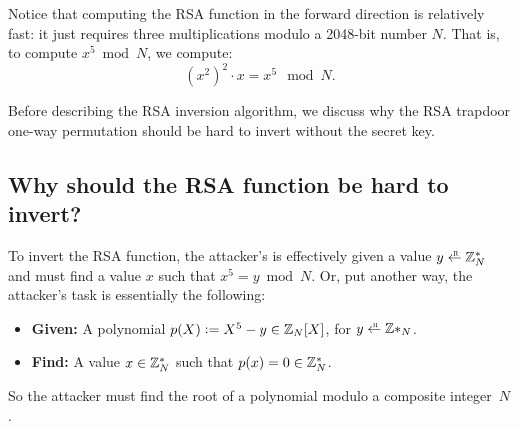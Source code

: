 Notice that computing the RSA function in the forward direction is
relatively fast: it just requires three multiplications 
modulo a 2048-bit number $N$. That is, to compute $x^5 \bmod N$, we compute:
\[ (x^2)^2 \cdot x = x^5\mod N.\]


\medskip

Before describing the RSA inversion algorithm, we discuss 
why the RSA trapdoor one-way permutation should be hard
to invert without the secret key.

\subsection{Why should the RSA function be hard to invert?}
To invert the RSA function, the attacker's is effectively given
a value $y \getsr \Z^*_N$ and must find a value $x$ such that $x^5 = y \bmod N$.
Or, put another way, the attacker's task is essentially the following:
\begin{itemize}
  \item \textbf{Given:} A polynomial $p(X) \mathrel{\mathop:}= X^5 - y \in \mathbb{Z}_N[X]$,
                        for $y \getsr \Z*_N$.
  \item \textbf{Find:}  A value $x \in \mathbb{Z}^*_N$ such that $p(x) = 0 \in \mathbb{Z}^*_N$.
\end{itemize}

So the attacker must find the root of a polynomial modulo a composite integer~$N$.

